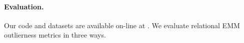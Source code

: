 {%
%
%
%
%
\paragraph{Evaluation.} Our code and datasets are available on-line at \cite{url}. We evaluate relational EMM outlierness metrics in three ways.

}
